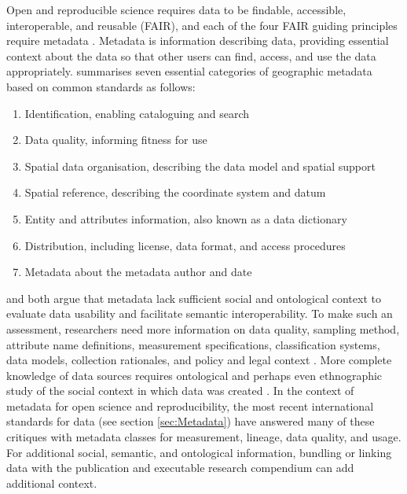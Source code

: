 \documentclass{isprs} %
\begin{document}
Open and reproducible science requires data to be findable, accessible, interoperable, and reusable (FAIR), and each of the four FAIR guiding principles require metadata \citep{Wilkinson2016, NASEM2018}.
Metadata is information describing data, providing essential context about the data so that other users can find, access, and use the data appropriately.
\citet{Kim1999} summarises seven essential categories of geographic metadata based on common standards as follows:
\\
\begin{enumerate}
\setlength\itemsep{0em}\setlength\parskip{0em}\setlength\topsep{0em}\setlength\partopsep{0em}\setlength\parsep{0em} 
\item{Identification, enabling cataloguing and search} 
\item{Data quality, informing fitness for use}
\item{Spatial data organisation, describing the data model and spatial support}
\item{Spatial reference, describing the coordinate system and datum}
\item{Entity and attributes information, also known as a data dictionary}
\item{Distribution, including license, data format, and access procedures}
\item{Metadata about the metadata author and date}
\end{enumerate}

\citet{Schuurman2006} and \citet{Comber2008} both argue that metadata lack sufficient social and ontological context to evaluate data usability and facilitate semantic interoperability.
To make such an assessment, researchers need more information on data quality, sampling method, attribute name definitions, measurement specifications, classification systems, data models, collection rationales, and policy and legal context \citep{Schuurman2006}.
More complete knowledge of data sources requires ontological and perhaps even ethnographic study of the social context in which data was created \citep{Schuurman2008}.
In the context of metadata for open science and reproducibility, the most recent international standards for data (see section \ref{sec:Metadata}) have answered many of these critiques with metadata classes for measurement, lineage, data quality, and usage.
For additional social, semantic, and ontological information, bundling or linking data with the publication and executable research compendium can add additional context.
\end{document}
